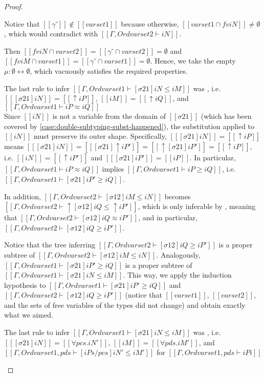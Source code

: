 \begin{proof}
\begin{caseof}
    Notice that $[[γ⁻]] \notin [[varset1]]$ because otherwise,
    $[[varset1 ∩ fv iN]] \neq \emptyset$,
    which would contradict with $[[Γ, Ord varset2 ⊢ iN]]$.

    Then $[[fv iN ∩ varset2]] = [[{γ⁻} ∩ varset2]] = \emptyset$ and $[[fv iM ∩
    varset1]] = [[{γ⁻} ∩ varset1]] = \emptyset$.
    Hence, we take the empty $\mu : \emptyset \leftrightarrow \emptyset$, which
    vacuously satisfies the required properties.

  \item The last rule to infer $[[Γ, Ord varset1 ⊢ [σ21]iN ≤ iM]]$ was
    , i.e. $[[ [σ21]iN ]] = [[↑iP]]$, $[[ iM
    ]] = [[↑iQ]]$, and $[[Γ, Ord varset1 ⊢ iP ≈ iQ]]$\\
    Since $[[iN]]$ is not a variable from the domain of $[[σ21]]$ (which has
    been covered by \cref{case:double-subtyping-subst-happened}),
    the substitution applied to $[[iN]]$ must preserve its outer shape.
    Specifically, $[[ [σ21]iN ]] = [[↑iP]]$ means
    $[[ [σ21]iN ]] = [[ [σ21]↑iP']] = [[ ↑[σ21]iP']] =[[↑iP]]$,
    i.e. $[[ iN ]] = [[↑iP']]$ and
    $[[ [σ21]iP']] = [[iP]]$. In particular,
    $[[Γ, Ord varset1 ⊢ iP ≈ iQ]]$ implies
    $[[Γ, Ord varset1 ⊢ iP ≥ iQ]]$, i.e.
    $[[Γ, Ord varset1 ⊢ [σ21]iP' ≥ iQ]]$.

    In addition, $[[Γ, Ord varset2 ⊢ [σ12]iM ≤ iN]]$ becomes
    $[[Γ, Ord varset2 ⊢ ↑[σ12]iQ ≤ ↑iP']]$, which is only inferable by
    , meaning that
    $[[Γ, Ord varset2 ⊢ [σ12]iQ ≈ iP']]$, and in particular,
    $[[Γ, Ord varset2 ⊢ [σ12]iQ ≥ iP']]$.

    Notice that the tree inferring $[[Γ, Ord varset2 ⊢ [σ12]iQ ≥ iP']]$ is a
    proper subtree of $[[Γ, Ord varset2 ⊢ [σ12]iM ≤ iN]]$. Analogously,
    $[[Γ, Ord varset1 ⊢ [σ21]iP' ≥ iQ]]$ is a proper subtree of
    $[[Γ, Ord varset1 ⊢ [σ21]iN ≤ iM]]$. This way, we apply the induction
    hypothesis to $[[Γ, Ord varset1 ⊢ [σ21]iP' ≥ iQ]]$ and $[[Γ, Ord varset2 ⊢
    [σ12]iQ ≥ iP']]$ (notice that $[[varset1]]$, $[[varset2]]$, and the sets of free variables of
    the types did not change) and obtain exactly what we aimed.

  \item The last rule to infer $[[Γ, Ord varset1 ⊢ [σ21]iN ≤ iM]]$ was
    , i.e. $[[ [σ21]iN ]] = [[∀pcs.iN']]$,
    $[[iM]] = [[∀pds.iM']]$, and $[[Γ, Ord varset1, pds ⊢ [iPs/pcs]iN' ≤ iM']]$
    for  $[[Γ, Ord varset1, pds ⊢ iPi]]$ \\


\end{caseof}
\end{proof}
